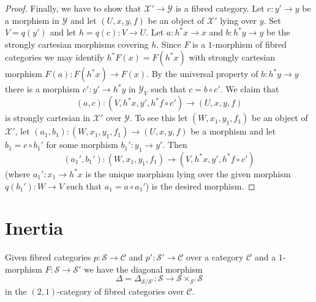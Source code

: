 \begin{proof}
\medskip\noindent
Finally, we have to show that $\mathcal{X}' \to \mathcal{Y}$ is a fibred
category. Let $c : y' \to y$ be a morphism in $\mathcal{Y}$
and let $(U, x, y, f)$ be an object of $\mathcal{X}'$ lying over $y$.
Set $V = q(y')$ and let $h = q(c) : V \to U$. Let $a : h^*x \to x$
and $b : h^*y \to y$ be the strongly cartesian morphisms covering $h$.
Since $F$ is a $1$-morphism of fibred categories we may identify
$h^*F(x) = F(h^*x)$ with strongly cartesian morphism
$F(a) : F(h^*x) \to F(x)$. By the universal property
of $b : h^*y \to y$ there is a morphism $c' : y' \to h^*y$ in
$\mathcal{Y}_V$ such that $c = b \circ c'$. We claim that
$$
(a, c) : (V, h^*x, y', h^*f \circ c') \longrightarrow (U, x, y, f)
$$
is strongly cartesian in $\mathcal{X}'$ over $\mathcal{Y}$. To see this
let $(W, x_1, y_1, f_1)$ be an object of $\mathcal{X}'$, let
$(a_1, b_1) : (W, x_1, y_1, f_1) \to (U, x, y, f)$ be a morphism
and let $b_1 = c \circ b_1'$ for some morphism $b_1' : y_1 \to y'$.
Then
$$
(a_1', b_1') : (W, x_1, y_1, f_1) \longrightarrow (V, h^*x, y', h^*f \circ c')
$$
(where $a_1' : x_1 \to h^*x$ is the unique morphism lying over the
given morphism $q(b_1') : W \to V$ such that $a_1 = a \circ a_1'$)
is the desired morphism.
\end{proof}

\section{Inertia}
\label{categories-section-inertia}
Given fibred categories $p : \mathcal{S} \to \mathcal{C}$ and
$p' : \mathcal{S}' \to \mathcal{C}$ over a category $\mathcal{C}$
and a $1$-morphism $F : \mathcal{S} \to \mathcal{S}'$
we have the diagonal morphism
$$
\Delta = \Delta_{\mathcal{S}/\mathcal{S}'} :
\mathcal{S} \longrightarrow \mathcal{S} \times_{\mathcal{S}'} \mathcal{S}
$$
in the $(2, 1)$-category of fibred categories over $\mathcal{C}$.

